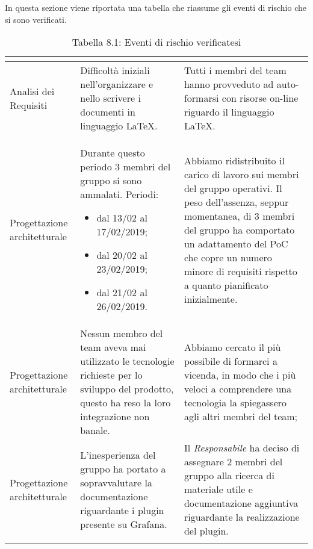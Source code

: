 In questa sezione viene riportata una tabella che riassume gli eventi di rischio che si sono verificati.
\\
\renewcommand{\arraystretch}{1.5}
\begin{longtable}{| m{7em} | m{15em} | m{16em} |}
\hline
\rowcolor{title_row}
\textbf{\color{title_text}{Periodo}}  & \textbf{\color{title_text}{Evento}} & \textbf{\color{title_text}{Reazione}} \\
\endhead
\hline
Analisi dei Requisiti & Difficoltà iniziali nell'organizzare e nello scrivere i documenti in linguaggio \LaTeX. & Tutti i membri del team hanno provveduto ad auto-formarsi con risorse on-line riguardo il linguaggio \LaTeX. \\
\hline
Progettazione architetturale & Durante questo periodo 3 membri del gruppo si sono ammalati. Periodi:\begin{itemize}
    \item dal 13/02 al 17/02/2019;
    \item dal 20/02 al 23/02/2019;
    \item dal 21/02 al 26/02/2019.
\end{itemize} & Abbiamo ridistribuito il carico di lavoro sui membri del gruppo operativi.
Il peso dell'assenza, seppur momentanea, di 3 membri del gruppo ha comportato un adattamento del PoC che copre un numero minore di requisiti rispetto a quanto pianificato inizialmente. \\
\hline
Progettazione architetturale & Nessun membro del team aveva mai utilizzato le tecnologie richieste per lo sviluppo del prodotto, questo ha reso la loro integrazione non banale. & Abbiamo cercato il più possibile di formarci a vicenda, in modo che i più veloci a comprendere una tecnologia la spiegassero agli altri membri del team; \\
\hline
Progettazione architetturale & L'inesperienza del gruppo ha portato a sopravvalutare la documentazione riguardante i plugin presente su Grafana. & Il \emph{Responsabile} ha deciso di assegnare 2 membri del gruppo alla ricerca di materiale utile e documentazione aggiuntiva riguardante la realizzazione del plugin. \\
\hline
\caption{Tabella 8.1: Eventi di rischio verificatesi\label{}}
\end{longtable}
\renewcommand{\arraystretch}{1}
\newpage
